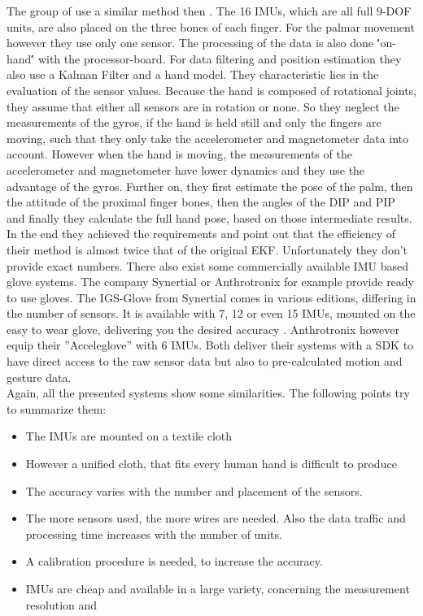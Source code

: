 The group of \cite{fang2014novel} use a similar method then \cite{kortier2012ambulatory}. The 16 IMUs, which are all full 9-DOF units, are also placed on the three bones of each finger. For the palmar movement however they use only one sensor. The processing of the data is also done \''on-hand\'' with the processor-board. For data filtering and position estimation they also use a Kalman Filter and a hand model. They characteristic lies in the evaluation of the sensor values. Because the hand is composed of rotational joints, they assume that either all sensors are in rotation or none. So they neglect the measurements of the gyros, if the hand is held still and only the fingers are moving, such that they only take the accelerometer and magnetometer data into account. However when the hand is moving, the measurements of the accelerometer and magnetometer have lower dynamics and they use the advantage of the gyros. Further on, they first estimate the pose of the palm, then the attitude of the proximal finger bones, then the angles of the DIP and PIP and finally they calculate the full hand pose, based on those intermediate results. In the end they achieved the requirements and point out that the efficiency of their method is almost twice that of the original EKF. Unfortunately they don't provide exact numbers.
There also exist some commercially available IMU based glove systems. The company Synertial or Anthrotronix for example provide ready to use gloves. The IGS-Glove from Synertial comes in various editions, differing in the number of sensors. It is available with 7, 12 or even 15 IMUs, mounted on the easy to wear glove, delivering you the desired accuracy \cite{Synertial}. Anthrotronix however equip their ''Acceleglove'' with 6 IMUs. Both deliver their systems with a SDK to have direct access to the raw sensor data but also to pre-calculated motion and gesture data.\\

Again, all the presented systems show some similarities. The following points try to summarize them:
\begin{itemize}
\item The IMUs are mounted on a textile cloth
\item However a unified cloth, that fits every human hand is difficult to produce
\item The accuracy varies with the number and placement of the sensors.
\item The more sensors used, the more wires are needed. Also the data traffic and processing time increases with the number of units.
\item A calibration procedure is needed, to increase the accuracy.
\item IMUs are cheap and available in a large variety, concerning the measurement resolution and 
\end{itemize}


